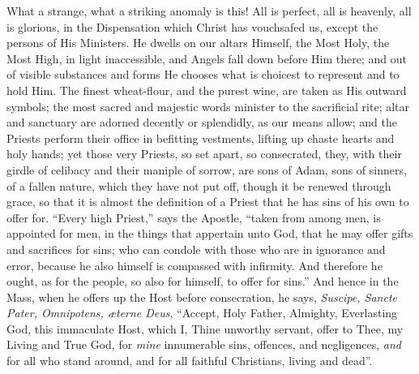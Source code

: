 What a strange, what a striking anomaly is this! All is perfect,
all is heavenly, all is glorious, in the Dispensation which Christ has
vouchsafed us, except the persons of His Ministers. He dwells on our
altars Himself, the Most Holy, the Most High, in light inaccessible,
and Angels fall down before Him there; and out of visible substances
and forms He chooses what is choicest to represent and to hold Him.
The finest wheat-flour, and the purest wine, are taken as His outward
symbols; the most sacred and majestic words minister to the
sacrificial rite; altar and sanctuary are adorned decently or
splendidly, as our means allow; and the Priests perform their office
in befitting vestments, lifting up chaste hearts and holy hands; yet
those very Priests, so set apart, so consecrated, they, with their
girdle of celibacy and their maniple of sorrow, are sons of Adam, sons
of sinners, of a fallen nature, which they have not put off, though it
be renewed through grace, so that it is almost the definition of a
Priest that he has sins of his own to offer for. ``Every high
Priest,'' says the Apostle, ``taken from among men, is
appointed for men, in the things that appertain unto God, that he may
offer gifts and sacrifices for sins; who can condole with those who
are in ignorance and error, because he also himself is compassed with
infirmity. And therefore he ought, as for the people, so also for
himself, to offer for sins.'' And hence in the Mass, when he
offers up the Host before consecration, he says, \emph{Suscipe, Sancte
Pater, Omnipotens, æterne Deus}, ``Accept, Holy Father,
Almighty, Everlasting God, this immaculate Host, which I, Thine
unworthy servant, offer to Thee, my Living and True God, for \emph{mine}
innumerable sins, offences, and negligences, \emph{and} for all who stand
around, and for all faithful Christians, living and dead''.

